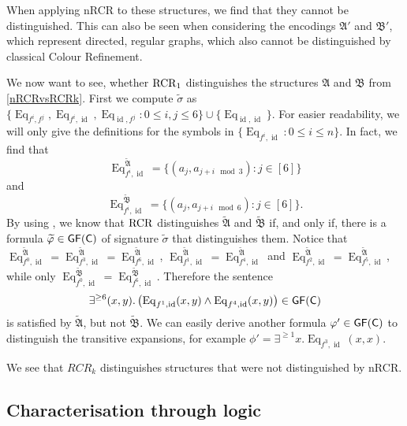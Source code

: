 When applying nRCR to these structures, we find that they cannot be distinguished.
This can also be seen when considering the encodings $\mathfrak A'$ and $\mathfrak B'$, which represent directed, regular graphs, which also cannot be distinguished by classical Colour Refinement.

We now want to see, whether $\operatorname{RCR}_1$ distinguishes the structures $\mathfrak A$ and $\mathfrak B$ from \cref{nRCRvsRCRk}.
First we compute $\widetilde\sigma$ as $\{\operatorname{Eq}_{f^i,f^j}, \operatorname{Eq}_{f^i,\operatorname{id}}, \operatorname{Eq}_{\operatorname{id},f^j} : 0\leq i,j \leq 6\}\cup\{\operatorname{Eq}_{\operatorname{id},\operatorname{id}}\}$. 
For easier readability, we will only give the definitions for the symbols in $\{\operatorname{Eq}_{f^i,\operatorname{id}} : 0 \leq i \leq n\}$. 
In fact, we find that 
$$\operatorname{Eq}_{f^i,\operatorname{id}}^{\widetilde{\mathfrak A}} = \{(a_j,a_{j+i \mod 3}) : j \in [6]\}$$
and 
$$\operatorname{Eq}_{f^i,\operatorname{id}}^{\widetilde{\mathfrak B}} = \{(a_j,a_{j+i \mod 6}) : j \in [6]\}.$$
By using \cite{scheidt2025ColorRefinement}, we know that $\operatorname{RCR}$ distinguishes $\widetilde{\mathfrak A}$ and $\widetilde{\mathfrak B}$ if, and only if, there is a formula $\widetilde{\varphi}\in\mathsf{GF}(\mathsf{C})$ of signature $\widetilde{\sigma}$ that distinguishes them.
Notice that $\operatorname{Eq}_{f^0,\operatorname{id}}^{\widetilde{\mathfrak A}}=\operatorname{Eq}_{f^3,\operatorname{id}}^{\widetilde{\mathfrak A}}=\operatorname{Eq}_{f^6,\operatorname{id}}^{\widetilde{\mathfrak A}}$, $\operatorname{Eq}_{f^1,\operatorname{id}}^{\widetilde{\mathfrak A}}=\operatorname{Eq}_{f^4,\operatorname{id}}^{\widetilde{\mathfrak A}}$ and $\operatorname{Eq}_{f^2,\operatorname{id}}^{\widetilde{\mathfrak A}}=\operatorname{Eq}_{f^5,\operatorname{id}}^{\widetilde{\mathfrak A}}$, while only $\operatorname{Eq}_{f^0,\operatorname{id}}^{\widetilde{\mathfrak B}}=\operatorname{Eq}_{f^6,\operatorname{id}}^{\widetilde{\mathfrak B}}$.
Therefore the sentence 
$$\exists^{\geq 6}(x,y).\left(\operatorname{Eq}_{f^1,\operatorname{id}}(x,y) \land \operatorname{Eq}_{f^4,\operatorname{id}}(x,y)\right)\in \mathsf{GF}(\mathsf{C})$$ 
is satisfied by $\widetilde{\mathfrak A}$, but not $\widetilde{\mathfrak B}$.
We can easily derive another formula $\varphi'\in \mathsf{GF}(\mathsf{C})$ to distinguish the transitive expansions, for example $\phi'=\exists^{\geq 1} x. \operatorname{Eq}_{f^3, \operatorname{id}}(x, x)$.

We see that $RCR_k$ distinguishes structures that were not distinguished by nRCR.

\subsection{Characterisation through logic}

